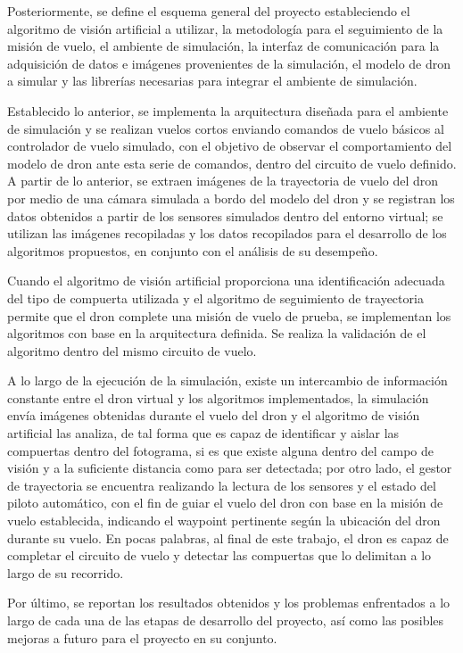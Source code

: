 Posteriormente, se define el esquema general del proyecto estableciendo el algoritmo de visión artificial a utilizar, la metodología para el seguimiento de la misión de vuelo, el ambiente de simulación, la interfaz de comunicación para la adquisición de datos e imágenes provenientes de la simulación, el modelo de dron a simular y las librerías necesarias para integrar el ambiente de simulación.

Establecido lo anterior, se implementa la arquitectura diseñada para el ambiente de simulación y se realizan vuelos cortos enviando comandos de vuelo básicos al controlador de vuelo simulado, con el objetivo de observar el comportamiento del modelo de dron ante esta serie de comandos, dentro del circuito de vuelo definido. A partir de lo anterior, se extraen imágenes de la trayectoria de vuelo del dron por medio de una cámara simulada a bordo del modelo del dron y se registran los datos obtenidos a partir de los sensores simulados dentro del entorno virtual; se utilizan las imágenes recopiladas y los datos recopilados para el desarrollo de los algoritmos propuestos, en conjunto con el análisis de su desempeño.

Cuando el algoritmo de visión artificial proporciona una identificación adecuada del tipo de compuerta utilizada y el algoritmo de seguimiento de trayectoria permite que el dron complete una misión de vuelo de prueba, se implementan los algoritmos con base en la arquitectura definida. Se realiza la validación de el algoritmo dentro del mismo circuito de vuelo. 

A lo largo de la ejecución de la simulación, existe un intercambio de información constante entre el dron virtual y los algoritmos implementados, la simulación envía imágenes obtenidas durante el vuelo del dron y el algoritmo de visión artificial las analiza, de tal forma que es capaz de identificar y aislar las compuertas dentro del fotograma, si es que existe alguna dentro del campo de visión y a la suficiente distancia como para ser detectada; por otro lado, el gestor de trayectoria se encuentra realizando la lectura de los sensores y el estado del piloto automático, con el fin de guiar el vuelo del dron con base en la misión de vuelo establecida, indicando el waypoint pertinente según la ubicación del dron durante su vuelo. En pocas palabras, al final de este trabajo, el dron es capaz de completar el circuito de vuelo y detectar las compuertas que lo delimitan a lo largo de su recorrido.

Por último, se reportan los resultados obtenidos y los problemas enfrentados a lo largo de cada una de las etapas de desarrollo del proyecto, así como las posibles mejoras a futuro para el proyecto en su conjunto.



